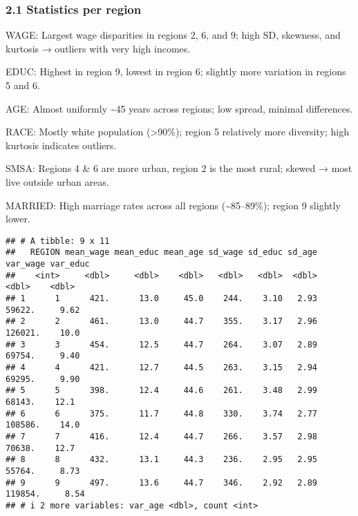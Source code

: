 \documentclass[
]{article}
\begin{document}
\subsubsection{\texorpdfstring{\textbf{2.1 Statistics per
region}}{2.1 Statistics per region}}\label{statistics-per-region}

WAGE: Largest wage disparities in regions 2, 6, and 9; high SD,
skewness, and kurtosis → outliers with very high incomes.

EDUC: Highest in region 9, lowest in region 6; slightly more variation
in regions 5 and 6.

AGE: Almost uniformly \textasciitilde45 years across regions; low
spread, minimal differences.

RACE: Mostly white population (\textgreater90\%); region 5 relatively
more diversity; high kurtosis indicates outliers.

SMSA: Regions 4 \& 6 are more urban, region 2 is the most rural; skewed
→ most live outside urban areas.

MARRIED: High marriage rates across all regions
(\textasciitilde85--89\%); region 9 slightly lower.

\begin{verbatim}
## # A tibble: 9 x 11
##   REGION mean_wage mean_educ mean_age sd_wage sd_educ sd_age var_wage var_educ
##    <int>     <dbl>     <dbl>    <dbl>   <dbl>   <dbl>  <dbl>    <dbl>    <dbl>
## 1      1      421.      13.0     45.0    244.    3.10   2.93   59622.     9.62
## 2      2      461.      13.0     44.7    355.    3.17   2.96  126021.    10.0 
## 3      3      454.      12.5     44.7    264.    3.07   2.89   69754.     9.40
## 4      4      421.      12.7     44.5    263.    3.15   2.94   69295.     9.90
## 5      5      398.      12.4     44.6    261.    3.48   2.99   68143.    12.1 
## 6      6      375.      11.7     44.8    330.    3.74   2.77  108586.    14.0 
## 7      7      416.      12.4     44.7    266.    3.57   2.98   70638.    12.7 
## 8      8      432.      13.1     44.3    236.    2.95   2.95   55764.     8.73
## 9      9      497.      13.6     44.7    346.    2.92   2.89  119854.     8.54
## # i 2 more variables: var_age <dbl>, count <int>
\end{verbatim}
\end{document}
